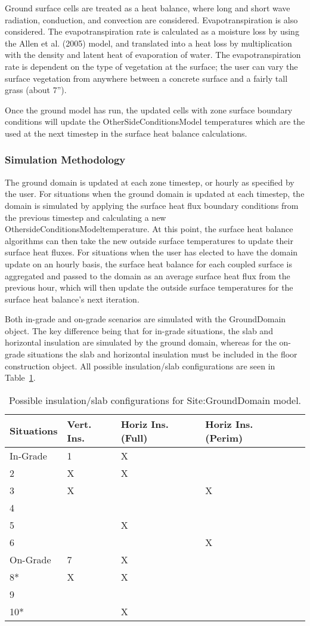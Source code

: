 Ground surface cells are treated as a heat balance, where long and short wave radiation, conduction, and convection are considered. Evapotranspiration is also considered. The evapotranspiration rate is calculated as a moisture loss by using the Allen et al. (2005) model, and translated into a heat loss by multiplication with the density and latent heat of evaporation of water. The evapotranspiration rate is dependent on the type of vegetation at the surface; the user can vary the surface vegetation from anywhere between a concrete surface and a fairly tall grass (about 7'').

Once the ground model has run, the updated cells with zone surface boundary conditions will update the OtherSideConditionsModel temperatures which are the used at the next timestep in the surface heat balance calculations.

\subsubsection{Simulation Methodology}\label{simulation-methodology-000}

The ground domain is updated at each zone timestep, or hourly as specified by the user. For situations when the ground domain is updated at each timestep, the domain is simulated by applying the surface heat flux boundary conditions from the previous timestep and calculating a new OthersideConditionsModeltemperature. At this point, the surface heat balance algorithms can then take the new outside surface temperatures to update their surface heat fluxes. For situations when the user has elected to have the domain update on an hourly basis, the surface heat balance for each coupled surface is aggregated and passed to the domain as an average surface heat flux from the previous hour, which will then update the outside surface temperatures for the surface heat balance's next iteration.

Both in-grade and on-grade scenarios are simulated with the GroundDomain object. The key difference being that for in-grade situations, the slab and horizontal insulation are simulated by the ground domain, whereas for the on-grade situations the slab and horizontal insulation must be included in the floor construction object. All possible insulation/slab configurations are seen in Table~\ref{table:possible-insulationslab-configurations-for}.

\begin{longtable}[c]{@{}lllll@{}}
\caption{Possible insulation/slab configurations for Site:GroundDomain model. \protect \label{table:possible-insulationslab-configurations-for}}\\
\toprule 
Situations & Vert. Ins. & Horiz Ins. (Full) & Horiz Ins. (Perim) \tabularnewline \midrule
\endhead
In-Grade & 1 & X &  &  \tabularnewline
2 & X & X &  \tabularnewline
3 & X &  & X \tabularnewline
4 &  &  &  \tabularnewline
5 &  & X &  \tabularnewline
6 &  &  & X \tabularnewline
On-Grade & 7 & X &  &  \tabularnewline
8* & X & X &  \tabularnewline
9 &  &  &  \tabularnewline
10* &  & X &  \tabularnewline
\bottomrule
\end{longtable}

